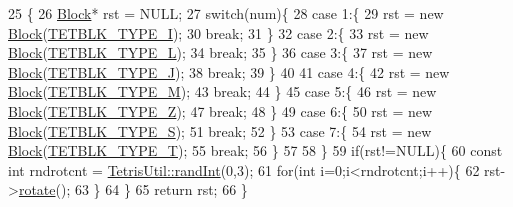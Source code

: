 \begin{DoxyCode}
25                                                \{
26                 \hyperlink{class_tetris_1_1_block}{Block}* rst = NULL;
27                 \textcolor{keywordflow}{switch}(num)\{
28                     \textcolor{keywordflow}{case} 1:\{
29                         rst = \textcolor{keyword}{new} \hyperlink{class_tetris_1_1_block}{Block}(\hyperlink{_block_8h_ac9fe505a10c9ea541483202000c72dfe}{TETBLK\_TYPE\_I});
30                         \textcolor{keywordflow}{break};
31                     \}
32                     \textcolor{keywordflow}{case} 2:\{
33                         rst = \textcolor{keyword}{new} \hyperlink{class_tetris_1_1_block}{Block}(\hyperlink{_block_8h_aa30a45ef914d6bd7caf960c42af38197}{TETBLK\_TYPE\_L});
34                         \textcolor{keywordflow}{break};
35                     \}
36                     \textcolor{keywordflow}{case} 3:\{
37                         rst = \textcolor{keyword}{new} \hyperlink{class_tetris_1_1_block}{Block}(\hyperlink{_block_8h_a3a84ffcf3638f400ed5ebc303d152a94}{TETBLK\_TYPE\_J});
38                         \textcolor{keywordflow}{break};
39                     \}
40 
41                     \textcolor{keywordflow}{case} 4:\{
42                         rst = \textcolor{keyword}{new} \hyperlink{class_tetris_1_1_block}{Block}(\hyperlink{_block_8h_a6da1e2b8848e1a7b5a7ee687fd6492bd}{TETBLK\_TYPE\_M});
43                         \textcolor{keywordflow}{break};
44                     \}
45                     \textcolor{keywordflow}{case} 5:\{
46                         rst = \textcolor{keyword}{new} \hyperlink{class_tetris_1_1_block}{Block}(\hyperlink{_block_8h_a50283efc563e3ebe3b8ac84947491f5d}{TETBLK\_TYPE\_Z});
47                         \textcolor{keywordflow}{break};
48                     \}
49                     \textcolor{keywordflow}{case} 6:\{
50                         rst = \textcolor{keyword}{new} \hyperlink{class_tetris_1_1_block}{Block}(\hyperlink{_block_8h_afb6b4a709481a06422a9a9daedb334ee}{TETBLK\_TYPE\_S});
51                         \textcolor{keywordflow}{break};
52                     \}
53                     \textcolor{keywordflow}{case} 7:\{
54                         rst = \textcolor{keyword}{new} \hyperlink{class_tetris_1_1_block}{Block}(\hyperlink{_block_8h_aa624341303e91efd01c17dfb25d15010}{TETBLK\_TYPE\_T});
55                         \textcolor{keywordflow}{break};
56                     \}
57 
58                 \}
59                 \textcolor{keywordflow}{if}(rst!=NULL)\{
60                     \textcolor{keyword}{const} \textcolor{keywordtype}{int} rndrotcnt = \hyperlink{class_tetris_util_a0a60e809425ddb416a500bcc03cf7061}{TetrisUtil::randInt}(0,3);
61                     \textcolor{keywordflow}{for}(\textcolor{keywordtype}{int} i=0;i<rndrotcnt;i++)\{
62                         rst->\hyperlink{class_tetris_1_1_block_a0d1eb57e6da91832ad983f7a4fa9ca04}{rotate}();
63                     \}
64                 \}
65                 \textcolor{keywordflow}{return} rst;
66             \}
\end{DoxyCode}
